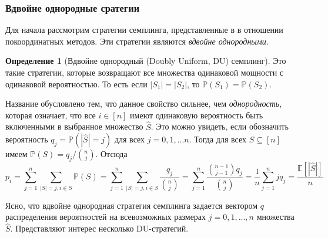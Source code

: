 \documentclass{article}
\theoremstyle{definition}
\newtheorem{definition}{Определение}
\theoremstyle{assumption}
\theoremstyle{lemma}
\theoremstyle{theorem}
\theoremstyle{proposition}
\begin{document}
	\subsubsection{Вдвойне однородные сратегии}
	
	Для начала рассмотрим стратегии семплинга, представленные в \cite{richtarik2016parallel} в отношении покоординатных методов. Эти стратегии являются \textit{вдвойне однородными.}
	
	\begin{definition}[Вдвойне однородный (Doubly Uniform, DU) семплинг] \label{DU}
		Это такие стратегии, которые возвращают все множества одинаковой мощности с одинаковой вероятностью. То есть если $|S_1| = |S_2|$, то $\mathbb P(S_1) = \mathbb P(S_2)$.
	\end{definition}
	
	Название обусловлено тем, что данное свойство сильнее, чем \textit{однородность}, которая означает, что все $i \in [n]$ имеют одинаковую вероятность быть включенными в выбранное множество $\hat S$. Это можно увидеть, если обозначить вероятность $q_j = \mathbb P(|\hat S| = j)$ для всех $j = 0, 1, ... n$. Тогда для всех $S \subseteq [n]$ имеем $\mathbb P(S) = q_j / \binom{n}{j}$. Отсюда
	\begin{equation}
		p_i = \sum \limits_{j=1}^n \sum \limits_{|S|=j, i \in S} \mathbb P(S) = \sum \limits_{j=1}^n \sum \limits_{|S|=j, i \in S} \frac{q_j}{\binom{n}{j}} = \sum \limits_{j=1}^n   \frac{\binom{n-1}{j-1}q_j}{\binom{n}{j}} = \frac{1}{n} \sum \limits_{j=1}^n j q_j = \frac{\mathbb E[|\hat S|]}{n}
	\end{equation}
	
	Ясно, что вдвойне однородная стратегия семплинга задается вектором $q$ распределения вероятностей на всевозможных размерах $j = 0, 1, ..., n$ множества $\hat S$. Представляют интерес несколько DU-стратегий.
	
\end{document}

